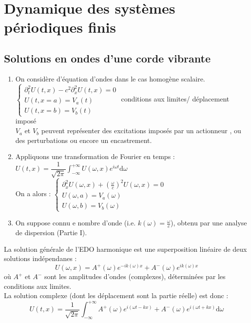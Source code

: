 \documentclass[12pt,a4paper]{article}
\begin{document}
	
\section{Dynamique des systèmes périodiques finis}
\subsection{Solutions en ondes d'une corde vibrante}
\begin{enumerate}[label=$\cdot$]
	\item On considère d'équation d'ondes dans le cas homogène scalaire.\\
$\begin{cases}
	\partial_t^2 U(t,x) -c^2\partial_x^2 U(t,x) = 0 \\
	U(t,x=a) = V_a(t)\\
	U(t,x=b) = V_b(t)
\end{cases}$ conditions aux limites/ déplacement imposé\\

$V_a$ et $V_b$ peuvent représenter des excitations imposés par un actionneur , ou des perturbations ou encore un encastrement.

	\item Appliquons une transformation de Fourier en temps :$U(t,x) = \dfrac1{\sqrt{2\pi}}\displaystyle\int_{-\infty}^{+\infty} U(\omega,x)e^{i\omega t}\mathrm d\omega$\\
	On a alors : $\begin{cases}
		\partial_x^2 U(\omega,x)+\left(\frac\omega c\right)^2U(\omega,x) = 0 \\
		U(\omega,a) = V_a(\omega)\\
		U(\omega,b) = V_b(\omega)
	\end{cases}$
	
	\item On suppose connu e nombre d'onde (i.e. $k(\omega)=\frac\omega c$), obtenu par une analyse de dispersion (Partie I).
\end{enumerate}
	
La solution générale de l'EDO harmonique est une superposition linéaire de deux solutions indépendanes : 
\[
U(\omega,x) = A^+(\omega)e^{-ik(\omega)x} + A^-(\omega)e^{ik(\omega)x}
\]
où $A^+$ et $A^-$ sont les amplitudes d'ondes (complexes), déterminées par les conditions aux limites.\\
La solution complexe (dont les déplacement sont la partie réelle) est donc :
\[
U(t,x) = \dfrac1{\sqrt{2\pi}}\displaystyle\int_{-\infty}^{+\infty}A^+(\omega)e^{i(\omega t-kx)}+A^-(\omega)e^{i(\omega t+ kx)}\mathrm d\omega
\]
	
\end{document}
